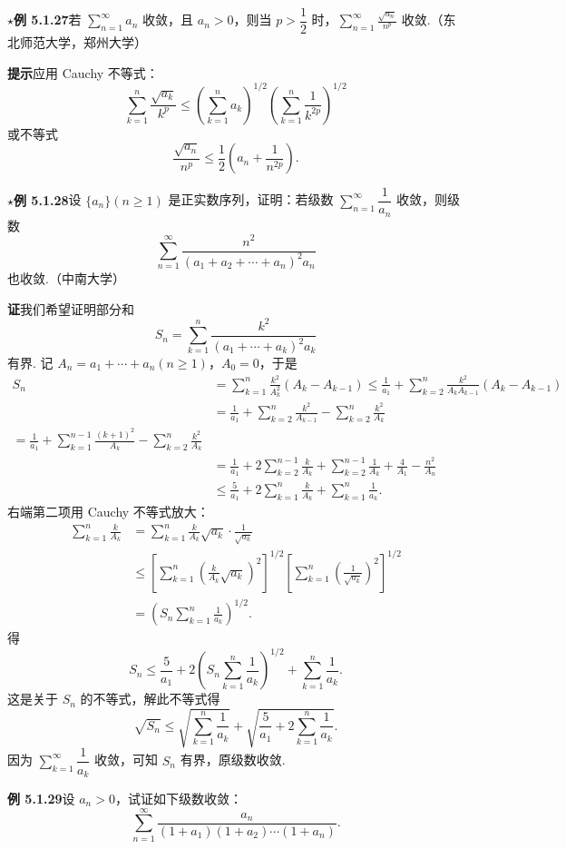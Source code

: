 \documentclass[UTF8, 12pt, fontset=fandol, oneside]{ctexart}
\begin{document}
\noindent\textbf{$\star$例 5.1.27}\quad 若 $\displaystyle\sum_{n=1}^\infty a_n$ 收敛，且 $a_n>0$，则当 $p>\dfrac12$ 时，$\displaystyle\sum_{n=1}^\infty\frac{\sqrt{a_n}}{n^p}$ 收敛.（东北师范大学，郑州大学）

\noindent\textbf{提示}\quad 应用 Cauchy 不等式：
\[
  \sum_{k=1}^n\frac{\sqrt{a_k}}{k^p}
  \le\left(\sum_{k=1}^n a_k\right)^{1/2}
  \left(\sum_{k=1}^n\frac1{k^{2p}}\right)^{1/2}
\]
或不等式
\[
  \frac{\sqrt{a_n}}{n^p}\le\frac12\left(a_n+\frac1{n^{2p}}\right).
\]

\noindent\textbf{$\star$例 5.1.28}\quad 设 $\{a_n\}(n\ge1)$ 是正实数序列，证明：若级数 $\displaystyle\sum_{n=1}^\infty\dfrac1{a_n}$ 收敛，则级数
\[
  \sum_{n=1}^\infty
  \frac{n^2}{(a_1+a_2+\cdots+a_n)^2a_n}
\]
也收敛.（中南大学）

\noindent\textbf{证}\quad 我们希望证明部分和
\[
  S_n=\sum_{k=1}^n\frac{k^2}{(a_1+\cdots+a_k)^2a_k}
\]
有界. 记 $A_n=a_1+\cdots+a_n(n\ge1)$，$A_0=0$，于是
\[
\begin{aligned}
S_n
&=\sum_{k=1}^n\frac{k^2}{A_k^2}(A_k-A_{k-1})
\le\frac1{a_1}+\sum_{k=2}^n\frac{k^2}{A_kA_{k-1}}(A_k-A_{k-1})\\
&=\frac1{a_1}+\sum_{k=2}^n\frac{k^2}{A_{k-1}}-\sum_{k=2}^n\frac{k^2}{A_k}\\
 =\frac1{a_1}+\sum_{k=1}^{n-1}\frac{(k+1)^2}{A_k}-\sum_{k=2}^n\frac{k^2}{A_k}\\
&=\frac1{a_1}+2\sum_{k=2}^{n-1}\frac{k}{A_k}
  +\sum_{k=2}^{n-1}\frac1{A_k}
  +\frac4{A_1}-\frac{n^2}{A_n}\\
&\le\frac5{a_1}+2\sum_{k=1}^n\frac{k}{A_k}
  +\sum_{k=1}^n\frac1{a_k}.
\end{aligned}
\]
右端第二项用 Cauchy 不等式放大：
\[
\begin{aligned}
\sum_{k=1}^n\frac{k}{A_k}
&=\sum_{k=1}^n\frac{k}{A_k}\sqrt{a_k}\cdot\frac1{\sqrt{a_k}}\\
&\le
\left[\sum_{k=1}^n\left(\frac{k}{A_k}\sqrt{a_k}\right)^2\right]^{1/2}
\left[\sum_{k=1}^n\left(\frac1{\sqrt{a_k}}\right)^2\right]^{1/2}\\
&=\left(S_n\sum_{k=1}^n\frac1{a_k}\right)^{1/2}.
\end{aligned}
\]
得
\[
  S_n\le\frac5{a_1}+2\left(S_n\sum_{k=1}^n\frac1{a_k}\right)^{1/2}
  +\sum_{k=1}^n\frac1{a_k}.
\]
这是关于 $S_n$ 的不等式，解此不等式得
\[
  \sqrt{S_n}\le
  \sqrt{\sum_{k=1}^n\frac1{a_k}}+
  \sqrt{\frac5{a_1}+2\sum_{k=1}^n\frac1{a_k}}.
\]
因为 $\displaystyle\sum_{k=1}^\infty\dfrac1{a_k}$ 收敛，可知 $S_n$ 有界，原级数收敛.

\noindent\textbf{例 5.1.29}\quad 设 $a_n>0$，试证如下级数收敛：
\[
  \sum_{n=1}^\infty
  \frac{a_n}{(1+a_1)(1+a_2)\cdots(1+a_n)}.
\]
\end{document}
